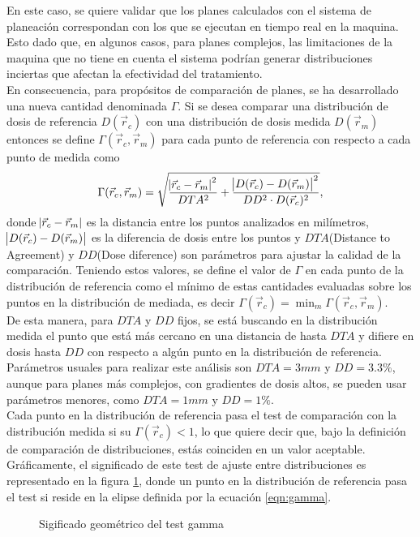 En este caso, se quiere validar que los planes calculados con el sistema de planeación correspondan con los que se ejecutan en tiempo real en la maquina. Esto dado que, en algunos casos, para planes complejos, las limitaciones de la maquina que no tiene en cuenta el sistema podrían generar distribuciones inciertas que afectan la efectividad del tratamiento.\\

En consecuencia, para propósitos de comparación de planes, se ha desarrollado una nueva cantidad denominada $\Gamma$. Si se desea comparar una distribución de dosis de referencia $D(\vec{r}_{c})$ con una distribución de dosis medida $D(\vec{r}_{m})$ entonces se define $\Gamma(\vec{r}_c,\vec{r}_m)$ para cada punto de referencia con respecto a cada punto de medida como 
\begin{equation}
\label{eqn:gamma}
	\Gamma(\vec{r}_c,\vec{r}_m)=\sqrt{\frac{\abs{\vec{r}_c-\vec{r}_m}^2}{DTA^2}+\frac{\abs{D(\vec{r}_c)-D(\vec{r}_m)}^2}{DD^2\cdot D(\vec{r}_c)^2}},
\end{equation}
donde $\abs{\vec{r}_c-\vec{r}_m}$ es la distancia entre los puntos analizados en milímetros, ${\abs{D(\vec{r}_c)-D(\vec{r}_m)}}$ es la diferencia de dosis entre los puntos y $DTA$(Distance to Agreement) y $DD$(Dose diference) son parámetros para ajustar la calidad de la comparación. Teniendo estos valores, se define el valor de $\Gamma$ en cada punto de la distribución de referencia como el mínimo de estas cantidades evaluadas sobre los puntos en la distribución de mediada, es decir $\Gamma(\vec{r}_c)=\min_{m} \Gamma(\vec{r}_c,\vec{r}_m)$.\\

De esta manera, para $DTA$ y $DD$ fijos, se está buscando en la distribución medida el punto que está más cercano en una distancia de hasta $DTA$ y difiere en dosis hasta $DD$ con respecto a algún punto en la distribución de referencia. Parámetros usuales para realizar este análisis son $DTA=3 mm$ y $DD=3.3\%$, aunque para planes más complejos, con gradientes de dosis altos, se pueden usar parámetros menores, como $DTA=1 mm$ y $DD=1\%$.\\

Cada punto en la distribución de referencia pasa el test de comparación con la distribución medida si su $\Gamma(\vec{r}_c)<1$, lo que quiere decir que, bajo la definición de comparación de distribuciones, estás coinciden en un valor aceptable. Gráficamente, el significado de este test de ajuste entre distribuciones es representado en la figura \ref{fig:elipseGamma}, donde un punto en la distribución de referencia pasa el test si reside en la elipse  definida por la ecuación \eqref{eqn:gamma}.\\
\begin{figure}
	\centering
	\caption{Sigificado geométrico del test gamma }
	\label{fig:elipseGamma}
\end{figure}

